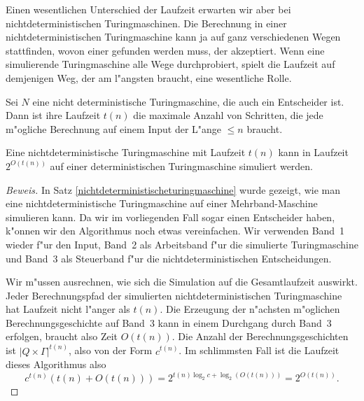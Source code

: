 Einen wesentlichen Unterschied der Laufzeit erwarten wir aber
bei nichtdeterministischen Turingmaschinen.
Die Berechnung in einer nichtdeterministischen Turingmaschine
kann ja auf ganz verschiedenen Wegen stattfinden, wovon
einer gefunden werden muss, der akzeptiert. Wenn eine simulierende
Turingmaschine alle Wege durchprobiert, spielt die Laufzeit auf
demjenigen Weg, der am l"angsten braucht, eine wesentliche Rolle.

\begin{definition}
Sei $N$ eine nicht deterministische Turingmaschine, die auch ein
Entscheider ist. Dann ist ihre Laufzeit $t(n)$ die maximale Anzahl
von Schritten, die jede m"ogliche Berechnung auf einem Input der
L"ange $\le n$ braucht.
\end{definition}

\begin{satz}
\label{exponentialtime}
Eine nichtdeterministische Turingmaschine mit Laufzeit $t(n)$
kann in Laufzeit $2^{O(t(n))}$
auf einer deterministischen Turingmaschine simuliert werden.
\end{satz}

\begin{proof}[Beweis]
In Satz \ref{nichtdeterministischeturingmaschine} wurde gezeigt,
wie man eine nichtdeterministische Turingmaschine auf einer
Mehrband-Maschine simulieren kann. Da wir im vorliegenden Fall
sogar einen Entscheider haben, k"onnen wir den Algorithmus noch
etwas vereinfachen. Wir verwenden Band~1 wieder f"ur den Input,
Band~2 als Arbeitsband f"ur die simulierte Turingmaschine und
Band~3 als Steuerband f"ur die nichtdeterministischen
Entscheidungen.

Wir m"ussen ausrechnen, wie sich die Simulation auf die 
Gesamtlaufzeit auswirkt. Jeder Berechnungspfad der simulierten
nichtdeterministischen Turingmaschine hat Laufzeit nicht
l"anger als $t(n)$. Die Erzeugung der n"achsten m"oglichen
Berechnungsgeschichte auf Band~3 kann in einem Durchgang
durch Band~3 erfolgen, braucht also Zeit $O(t(n))$.
Die Anzahl der Berechnungsgeschichten ist $|Q\times \Gamma|^{t(n)}$,
also von der Form $c^{t(n)}$. Im schlimmsten Fall ist die
Laufzeit dieses Algorithmus also
\[
c^{t(n)}(t(n) + O(t(n)))
=
2^{t(n) \log_2 c+ \log_2(O(t(n)))}
=
2^{O(t(n))}.
\]
\end{proof}
